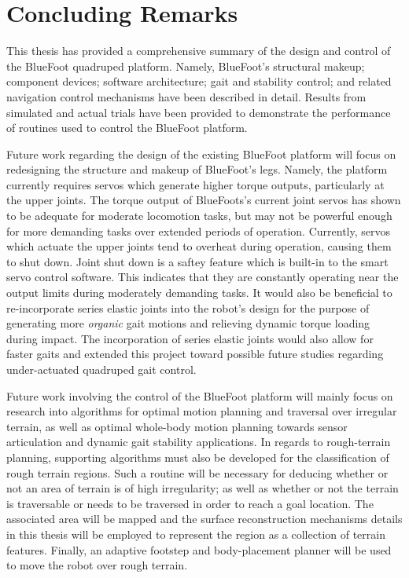 \chapter{Concluding Remarks}


This thesis has provided a comprehensive summary of the design and control of the BlueFoot quadruped platform. Namely, BlueFoot's structural makeup; component devices; software architecture; gait and stability control; and related navigation control mechanisms have been described in detail. Results from simulated and actual trials have been provided to demonstrate the performance of routines used to control the BlueFoot platform.


Future work regarding the design of the existing BlueFoot platform will focus on redesigning the structure and makeup of BlueFoot's legs. Namely, the platform currently requires servos which generate higher torque outputs, particularly at the upper joints. The torque output of BlueFoots's current joint servos has shown to be adequate for moderate locomotion tasks, but may not be powerful enough for more demanding tasks over extended periods of operation. Currently, servos which actuate the upper joints tend to overheat during operation, causing them to shut down. Joint shut down is a saftey feature which is built-in to the smart servo control software. This indicates that they are constantly operating near the output limits during moderately demanding tasks. It would also be beneficial to re-incorporate series elastic joints into the robot's design for the purpose of generating more \emph{organic} gait motions and relieving dynamic torque loading during impact. The incorporation of series elastic joints would also allow for faster gaits and extended this project toward possible future studies regarding under-actuated quadruped gait control.


Future work involving the control of the BlueFoot platform will mainly focus on research into algorithms for optimal motion planning and traversal over irregular terrain, as well as optimal whole-body motion planning towards sensor articulation and dynamic gait stability applications. In regards to rough-terrain planning, supporting algorithms must also be developed for the classification of rough terrain regions. Such a routine will be necessary for deducing whether or not an area of terrain is of high irregularity; as well as whether or not the terrain is traversable or needs to be traversed in order to reach a goal location. The associated area will be mapped and the surface reconstruction mechanisms details in this thesis will be employed to represent the region as a collection of terrain features. Finally, an adaptive footstep and body-placement planner will be used to move the robot over rough terrain. 


